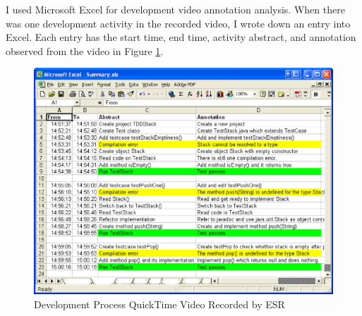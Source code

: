 I used Microsoft Excel for development video annotation analysis. When
there was one development activity in the recorded video, I wrote down
an entry into Excel. Each entry has the start time, end time, activity
abstract, and annotation observed from the video in Figure
\ref{fig:EsrVideoScript}.
\begin{figure}[htbp]
  \centering
  \includegraphics[width=1.0\textwidth]{figs/ESR-VideoScript.eps}
  \caption{Development Process QuickTime Video Recorded by ESR}\label{fig:EsrVideoScript}
\end{figure}

